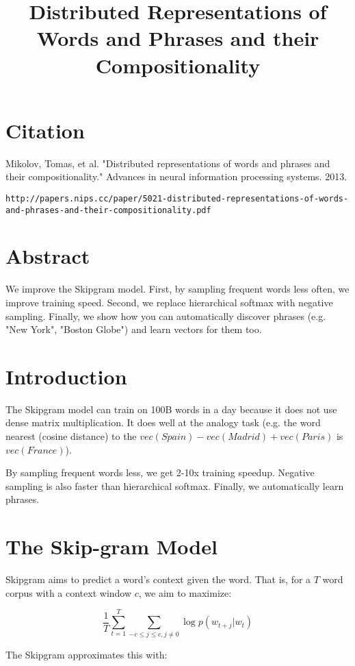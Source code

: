 \documentclass[a4paper]{article}
\title{Distributed Representations of Words and Phrases and their
Compositionality}
\date{}
\begin{document}
\maketitle

\section{Citation}
Mikolov, Tomas, et al. "Distributed representations of words and phrases and their compositionality." Advances in neural information processing systems. 2013.

\begin{verbatim}
http://papers.nips.cc/paper/5021-distributed-representations-of-words-and-phrases-and-their-compositionality.pdf
\end{verbatim}

\section{Abstract}
We improve the Skipgram model. First, by sampling frequent words less often,
we improve training speed. Second, we replace hierarchical softmax with
negative sampling. Finally, we show how you can automatically discover
phrases (e.g. "New York", "Boston Globe") and learn vectors for them too.

\section{Introduction}
The Skipgram model can train on 100B words in a day because it does not use
dense matrix multiplication. It does well at the analogy task (e.g.
the word nearest (cosine distance) to the $vec(Spain) - vec(Madrid) +
vec(Paris)$ is $vec(France)$).

By sampling frequent words less, we get 2-10x training speedup. Negative
sampling is also faster than hierarchical softmax. Finally, we automatically
learn phrases.

\section{The Skip-gram Model}
Skipgram aims to predict a word's context given the word. That is, for
a $T$ word corpus with a context window $c$, we aim to maximize:

$$
\frac{1}{T} \sum_{t=1}^{T}{\sum_{-c \leq j \leq c, j \ne 0}{
\log p(w_{t+ j} | w_t)
}}
$$

The Skipgram approximates this with:
\end{document}
